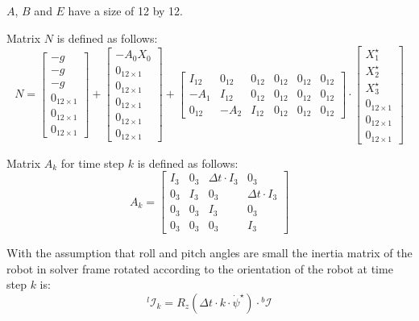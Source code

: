 \documentclass[a4paper,11pt]{article}
\begin{document}
$A$, $B$ and $E$ have a size of 12 by 12.

Matrix $N$ is defined as follows:
\begin{equation}
N = \begin{bmatrix} -g \\ -g \\ -g \\ 0_{12 \times 1} \\ 0_{12 \times 1} \\ 0_{12 \times 1} \end{bmatrix} + \begin{bmatrix} -A_0 X_0 \\ 0_{12 \times 1} \\ 0_{12 \times 1} \\ 0_{12 \times 1} \\ 0_{12 \times 1} \\ 0_{12 \times 1}  \end{bmatrix} + \begin{bmatrix} I_{12} & 0_{12} & 0_{12} & 0_{12} & 0_{12} & 0_{12}\\ -A_1 & I_{12} & 0_{12} & 0_{12} & 0_{12} & 0_{12} \\ 0_{12} & -A_2 & I_{12} & 0_{12} & 0_{12} & 0_{12}\end{bmatrix} \cdot \begin{bmatrix} X_1^\star \\ X_2^\star \\ X_3^\star \\ 0_{12 \times 1} \\ 0_{12 \times 1} \\ 0_{12 \times 1}  \end{bmatrix} 
\end{equation}

Matrix $A_k$ for time step $k$ is defined as follows:
\begin{equation}
A_k = \begin{bmatrix} 
I_3 & 0_3 & \Delta t \cdot I_3 & 0_3 \\
0_3 & I_3 & 0_3 & \Delta t \cdot I_3 \\
0_3 & 0_3 & I_3 & 0_3 \\
0_3 & 0_3 & 0_3 & I_3
\end{bmatrix}
\end{equation}


With the assumption that roll and pitch angles are small the inertia matrix of the robot in solver frame rotated according to the orientation of the robot at time step $k$ is:
\begin{equation}
{}^l\! \mathcal{I}_k = R_z(\Delta t \cdot k \cdot \dot \psi^\star) \cdot {}^b\!\mathcal{I}
\end{equation}
\end{document}
